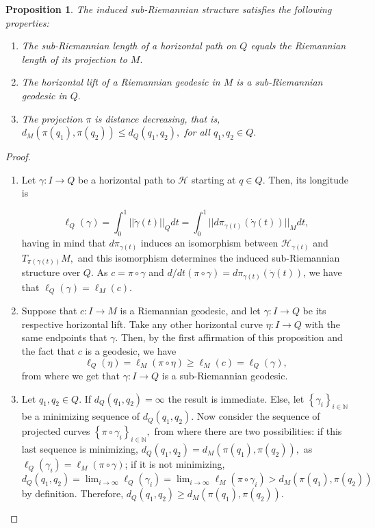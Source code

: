 \documentclass[12pt, letterpaper, reqno]{amsart}
\theoremstyle{definition}
\theoremstyle{plain}
\newtheorem{prop}{Proposition}
\theoremstyle{remark}
\begin{document}
\begin{prop}
	The induced sub-Riemannian structure satisfies the following properties:
	\begin{enumerate}
		\item The sub-Riemannian length of a horizontal path on $ Q $ equals the Riemannian length of its projection to $ M. $ 
		\item The horizontal lift of a Riemannian geodesic in $ M $ is a sub-Riemannian geodesic in $ Q. $ 
		\item The projection $ \pi $ is distance decreasing, that is, $ d_M(\pi(q_1), \pi(q_2))\leq d_Q(q_1,q_2), $ for all $ q_1,q_2\in Q. $ 
	\end{enumerate}
\end{prop}
\begin{proof}
	\begin{enumerate}
		\item Let $ \gamma: I \rightarrow {Q} $ be a horizontal path to $ \mathcal{H} $ starting at $ q\in Q. $ Then, its longitude is 

		$$\ell_Q(\gamma) = \int_0^1 ||\dot{\gamma} (t) ||_{Q} dt = \int_0^1 || d\pi_{\gamma(t)}(\dot{\gamma}(t))||_M dt,$$ 
		having in mind that $d\pi_{\gamma(t)}$ induces an isomorphism between $ \mathcal{H}_{\gamma(t)} $ and $ T_{\pi(\gamma(t))} M,$ and this isomorphism determines the induced sub-Riemannian structure over $ Q. $ As $c=\pi\circ\gamma$ and $ d/dt(\pi\circ\gamma) = d\pi_{\gamma(t)}(\dot{\gamma}(t)) $, we have that $ \ell_Q(\gamma)=\ell_M(c). $  

		\item Suppose that $ c: I \rightarrow {M} $ is a Riemannian geodesic, and let $ \gamma: I \rightarrow {Q} $ be its respective horizontal lift. Take any other horizontal curve $ \eta: I \rightarrow {Q} $ with the same endpoints that $ \gamma. $ Then, by the first affirmation of this proposition and the fact that $ c $ is a geodesic, we have
			$$ \ell_Q(\eta) = \ell_M(\pi\circ \eta) \geq \ell_M(c) = \ell_Q(\gamma),  $$ 
		from where we get that $ \gamma: I \rightarrow {Q} $ is a sub-Riemannian geodesic.

	\item Let $ q_1,q_2\in Q. $ If $ d_Q(q_1,q_2) = \infty $ the result is immediate. Else, let $ \left\{ \gamma_i \right\}_{i\in \mathbb{N}} $ be a minimizing sequence of $ d_Q(q_1,q_2). $ Now consider the sequence of projected curves $ \left\{ \pi\circ\gamma_i \right\}_{i\in \mathbb{N}}, $ from where there are two possibilities: if this last sequence is minimizing, $ d_Q(q_1, q_2) = d_M(\pi(q_1), \pi(q_2)),$ as $ \ell_Q(\gamma_i)=\ell_M(\pi\circ\gamma) $;  if it is not minimizing,  $d_Q(q_1,q_2) = \lim_{i \rightarrow \infty} \ell_Q(\gamma_i) = \lim_{i \rightarrow \infty} \ell_M(\pi\circ\gamma_i) > d_M(\pi(q_1),\pi(q_2))$ by definition. Therefore, $ d_Q(q_1,q_2)\geq d_M(\pi(q_1),\pi(q_2)).$
	\end{enumerate}
\end{proof}
\end{document}
